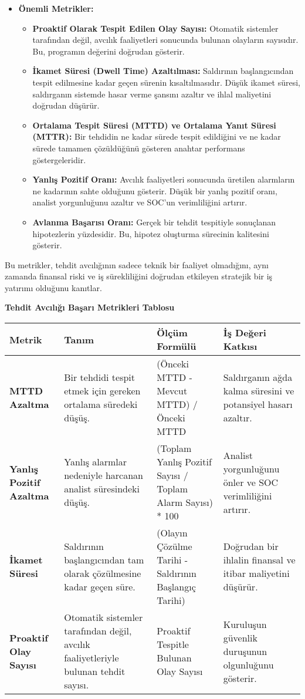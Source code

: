\begin{itemize}
    \item \textbf{Önemli Metrikler:}
    \begin{itemize}
        \item \textbf{Proaktif Olarak Tespit Edilen Olay Sayısı:} Otomatik sistemler tarafından değil, avcılık faaliyetleri sonucunda bulunan olayların sayısıdır. Bu, programın değerini doğrudan gösterir.
        \item \textbf{İkamet Süresi (Dwell Time) Azaltılması:} Saldırının başlangıcından tespit edilmesine kadar geçen sürenin kısaltılmasıdır. Düşük ikamet süresi, saldırganın sistemde hasar verme şansını azaltır ve ihlal maliyetini doğrudan düşürür.
        \item \textbf{Ortalama Tespit Süresi (MTTD) ve Ortalama Yanıt Süresi (MTTR):} Bir tehdidin ne kadar sürede tespit edildiğini ve ne kadar sürede tamamen çözüldüğünü gösteren anahtar performans göstergeleridir.
        \item \textbf{Yanlış Pozitif Oranı:} Avcılık faaliyetleri sonucunda üretilen alarmların ne kadarının sahte olduğunu gösterir. Düşük bir yanlış pozitif oranı, analist yorgunluğunu azaltır ve SOC'un verimliliğini artırır.
        \item \textbf{Avlanma Başarısı Oranı:} Gerçek bir tehdit tespitiyle sonuçlanan hipotezlerin yüzdesidir. Bu, hipotez oluşturma sürecinin kalitesini gösterir.
    \end{itemize}
\end{itemize}

Bu metrikler, tehdit avcılığının sadece teknik bir faaliyet olmadığını, aynı zamanda finansal riski ve iş sürekliliğini doğrudan etkileyen stratejik bir iş yatırımı olduğunu kanıtlar.

\textbf{Tehdit Avcılığı Başarı Metrikleri Tablosu}

\begin{tabularx}{\textwidth}{|l|X|X|X|}
\hline
\textbf{Metrik} & \textbf{Tanım} & \textbf{Ölçüm Formülü} & \textbf{İş Değeri Katkısı} \\
\hline
\textbf{MTTD Azaltma} & Bir tehdidi tespit etmek için gereken ortalama süredeki düşüş. & (Önceki MTTD - Mevcut MTTD) / Önceki MTTD & Saldırganın ağda kalma süresini ve potansiyel hasarı azaltır. \\
\hline
\textbf{Yanlış Pozitif Azaltma} & Yanlış alarmlar nedeniyle harcanan analist süresindeki düşüş. & (Toplam Yanlış Pozitif Sayısı / Toplam Alarm Sayısı) * 100 & Analist yorgunluğunu önler ve SOC verimliliğini artırır. \\
\hline
\textbf{İkamet Süresi} & Saldırının başlangıcından tam olarak çözülmesine kadar geçen süre. & (Olayın Çözülme Tarihi - Saldırının Başlangıç Tarihi) & Doğrudan bir ihlalin finansal ve itibar maliyetini düşürür. \\
\hline
\textbf{Proaktif Olay Sayısı} & Otomatik sistemler tarafından değil, avcılık faaliyetleriyle bulunan tehdit sayısı. & Proaktif Tespitle Bulunan Olay Sayısı & Kuruluşun güvenlik duruşunun olgunluğunu gösterir. \\
\hline
\end{tabularx}

